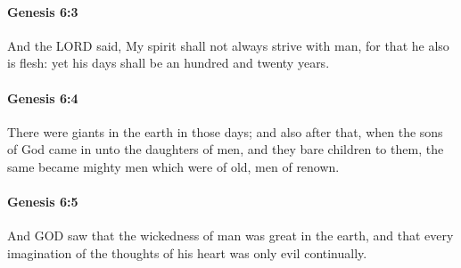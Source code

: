 		\paragraph{Genesis 6:3} %
			\label{GENESIS-6-3}

			And the LORD said, My spirit shall not always strive with man, for that he also is flesh: yet his days shall be an hundred and twenty years.


		\paragraph{Genesis 6:4} %
			\label{GENESIS-6-4}

			There were giants in the earth in those days; and also after that, when the sons of God came in unto the daughters of men, and they bare children to them, the same became mighty men which were of old, men of renown.


		\paragraph{Genesis 6:5} %
			\label{GENESIS-6-5}

			And GOD saw that the wickedness of man was great in the earth, and that every imagination of the thoughts of his heart was only evil continually.


